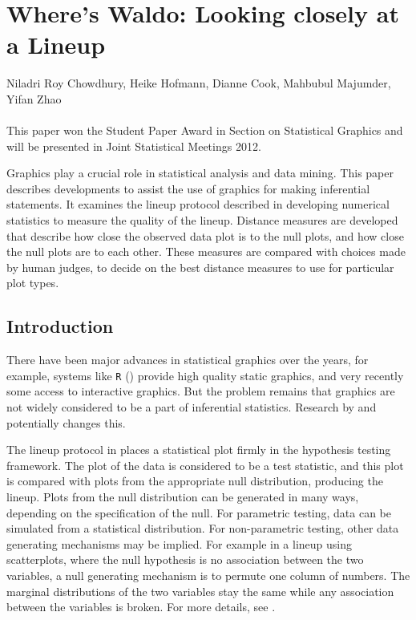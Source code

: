 
\chapter{Where's Waldo: Looking closely at a Lineup} \label{ch:waldo}
\vspace{-0.8cm}
\large{Niladri Roy Chowdhury, Heike Hofmann, Dianne Cook, Mahbubul Majumder, Yifan Zhao}\\ \\
\large{This paper won the Student Paper Award in Section on Statistical Graphics and will be presented in Joint Statistical Meetings 2012. } 

\vspace{1cm}
\normalsize
 Graphics play a crucial role in statistical analysis and data mining. This paper describes developments to assist the use of graphics for making inferential statements. It examines the lineup protocol described in \citet{buja:2009}  
  developing numerical statistics to measure the quality of the lineup. Distance measures are developed that describe how close the observed data plot is to the null plots, and how close the null plots are to each other. These measures are compared with choices made by human judges, to decide on the best distance measures to use for particular plot types.

\section{Introduction} 
There have been major advances in statistical graphics over the years, for example, systems like \texttt{R} (\cite{r}) provide high quality static graphics, and very recently some access to interactive graphics. But the problem remains that graphics are not widely considered to be a part of inferential statistics. Research by \citet{gelman:2004} and \citet{buja:2009} 
potentially changes this. 

The lineup protocol in \citep{buja:2009} 
places a statistical plot firmly in the hypothesis testing framework. The plot of the data is considered to be a test statistic, and this plot is compared with plots from the appropriate null distribution, producing the lineup. Plots from the null distribution can be generated in many ways, depending on the specification of the null. For parametric testing, data can be simulated from a statistical distribution. For non-parametric testing, other data generating mechanisms may be implied. For example in a lineup using scatterplots, where the null hypothesis is no association between the two variables,  a null generating mechanism is to permute one column of numbers. The marginal distributions of the two variables stay the same while any association between the variables is broken. For more details, see \cite{GOOD05}.

